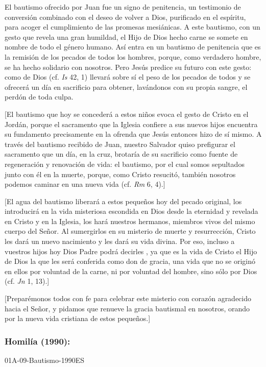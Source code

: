 \begin{body}
	El bautismo ofrecido por Juan fue un signo de penitencia, un testimonio de conversión combinado con el deseo de volver a Dios, purificado en el espíritu, para acoger el cumplimiento de las promesas mesiánicas. A este bautismo, con un gesto que revela una gran humildad, el Hijo de Dios hecho carne se somete en nombre de todo el género humano. Así entra en un bautismo de penitencia que es la remisión de los pecados de todos los hombres, porque, como verdadero hombre, se ha hecho solidario con nosotros. Pero Jesús predice su futuro con este gesto: como  de Dios (cf. \emph{Is} 42, 1) llevará sobre sí el peso de los pecados de todos y se ofrecerá un día en sacrificio para obtener, lavándonos con su propia sangre, el perdón de toda culpa.
	
	{[}El bautismo que hoy se concederá a estos niños evoca el gesto de Cristo en el Jordán, porque el sacramento que la Iglesia confiere a sus nuevos hijos encuentra su fundamento precisamente en la ofrenda que Jesús entonces hizo de sí mismo. A través del bautismo recibido de Juan, nuestro Salvador quiso prefigurar el sacramento que un día, en la cruz, brotaría de su sacrificio como fuente de regeneración y renovación de vida: el bautismo, por el cual somos sepultados junto con él en la muerte, porque, como Cristo resucitó, también nosotros podemos caminar en una nueva vida (cf. \emph{Rm} 6, 4).{]}
	
	{[}El agua del bautismo liberará a estos pequeños hoy del pecado original, los introducirá en la vida misteriosa escondida en Dios desde la eternidad y revelada en Cristo y en la Iglesia, los hará nuestros hermanos, miembros vivos del mismo cuerpo del Señor. Al sumergirlos en su misterio de muerte y resurrección, Cristo les dará un nuevo nacimiento y les dará su vida divina. Por eso, incluso a vuestros hijos hoy Dios Padre podrá decirles , ya que es la vida de Cristo el Hijo de Dios la que les será conferida como don de gracia, una vida que no se originó en ellos por voluntad de la carne, ni por voluntad del hombre, sino sólo por Dios (cf. \emph{Jn} 1, 13).{]}
	
	{[}Preparémonos todos con fe para celebrar este misterio con corazón agradecido hacia el Señor, y pidamos que renueve la gracia bautismal en nosotros, orando por la nueva vida cristiana de estos pequeños.{]}
	
	\subsubsection{Homilía (1990): } 01A-09-Bautismo-1990ES
	

\end{body}
